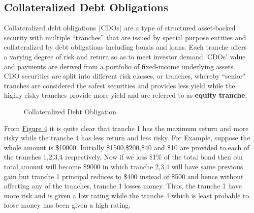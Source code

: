 \documentclass[11pt]{article}
\numberwithin{equation}{section}
\begin{document}
 \subsection{Collateralized Debt Obligations}
	   \medskip  
	   
Collateralized debt obligations (CDOs) are a type of structured asset-backed security with multiple ``tranches'' that are issued by special purpose entities and collateralized by debt obligations including bonds and loans. Each tranche offers a varying degree of risk and return so as to meet investor demand. CDOs' value and payments are derived from a portfolio of fixed-income underlying assets. CDO securities are split into different risk classes, or tranches, whereby ``senior" tranches are considered the safest securities and provides less yield while the highly risky tranches provide more yield and are referred to as \textbf{equity tranche}.  
\begin{figure}[H]
		\centering
		\caption{Collateralized Debt Obligation}
		\label{f4_a}
\end{figure} 

\hspace{1cm}From \hyperref[f4_a]{Figure 4} it is quite clear that tranche 1 has the maximum return and more risky while the tranche 4 has less return and less risky. For Example, suppose the whole amount is \$10000. Initially \$1500,\$200,\$40 and \$10 are provided to each of the tranches 1,2,3,4 respectively. 
Now if we loss \$1\% of the total bond then our total amount will become \$9000 in which tranche 2,3,4 will have same previous gain but tranche 1 principal reduces to \$400 instead of \$500 and hence without affecting any of the tranches, tranche 1 losses money. Thus, the tranche 1 have more risk and is given a low rating while the tranche 4 which is least probable to loose money has been given a high rating. \medskip
\end{document}
